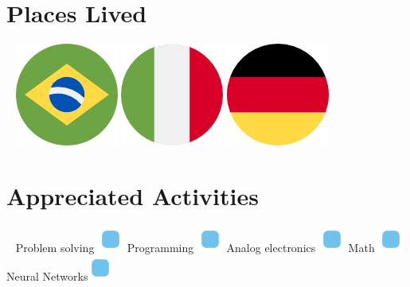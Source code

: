 \documentclass[]{friggeri-cv}
\begin{document}
\begin{aside}
	\section{Places Lived}
		~
		\includegraphics[scale=0.03]{img/brazil.png}    \includegraphics[scale=0.03]{img/italy.png}   \includegraphics[scale=0.03]{img/germany.png}
    	~
    \section{Appreciated Activities}
    	~
	    Problem solving \includegraphics[scale=0.40]{img/point.png}
	    Programming \includegraphics[scale=0.40]{img/point.png}
	    Analog electronics \includegraphics[scale=0.40]{img/point.png}
	    Math \includegraphics[scale=0.40]{img/point.png}
	    Neural Networks\includegraphics[scale=0.40]{img/point.png}
	    ~ 
\end{aside}
~
\\
\end{document}

